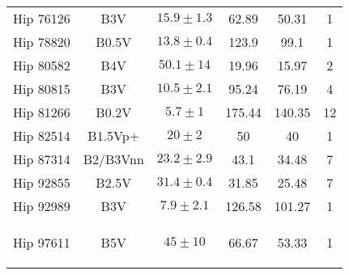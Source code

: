 \documentclass[11pt]{report}     %
\begin{document}
\begin{center}
\begin{small}
\begin{longtable}[h]{|cccccc|}
        Hip 76126 & B3V &$ 15.9 \pm 1.3 $& 62.89 & 50.31 & 1 \\ 
        Hip 78820 & B0.5V & $13.8 \pm 0.4$ & 123.9 & 99.1 & 1 \\
        Hip 80582 & B4V &$ 50.1 \pm 14 $& 19.96 & 15.97 & 2 \\ 
        Hip 80815 & B3V &$ 10.5 \pm 2.1 $& 95.24 & 76.19 & 4 \\ 
        Hip 81266 & B0.2V &$ 5.7 \pm 1 $& 175.44 & 140.35 & 12 \\ 
        Hip 82514 & B1.5Vp+ &$ 20 \pm 2 $& 50 & 40 & 1 \\ 
        Hip 87314 & B2/B3Vnn &$ 23.2 \pm 2.9 $& 43.1 & 34.48 & 7 \\ 
        Hip 92855 & B2.5V &$ 31.4 \pm 0.4 $& 31.85 & 25.48 & 7 \\ 
        Hip 92989 & B3V	&$ 7.9 \pm 2.1 $& 126.58 & 101.27 & 1 \\ 
        Hip 97611 & B5V &$ 45 \pm 10 $& 66.67 & 53.33 & 1        

        \label{tab:sample}
\end{longtable}
\end{small}
\end{center}
\end{document}
